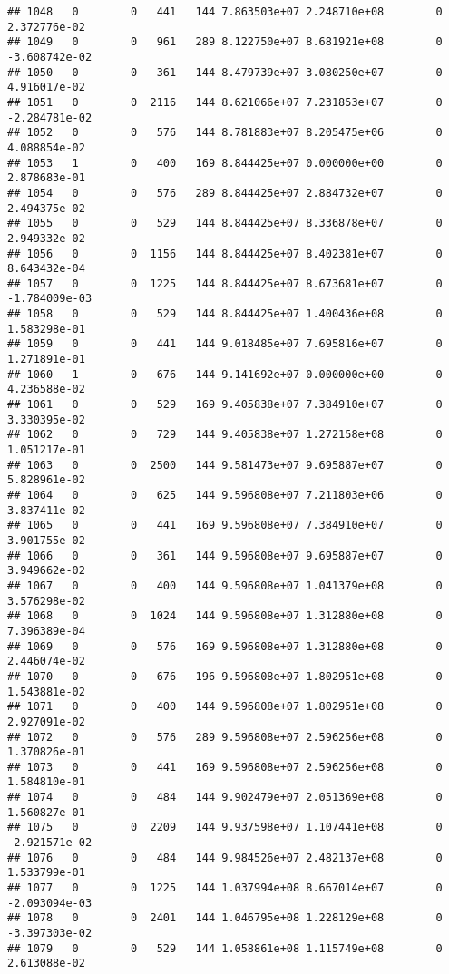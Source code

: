 \documentclass[
]{article}
\begin{document}
\begin{enumerate}
\begin{verbatim}
## 1048   0        0   441   144 7.863503e+07 2.248710e+08        0  2.372776e-02
## 1049   0        0   961   289 8.122750e+07 8.681921e+08        0 -3.608742e-02
## 1050   0        0   361   144 8.479739e+07 3.080250e+07        0  4.916017e-02
## 1051   0        0  2116   144 8.621066e+07 7.231853e+07        0 -2.284781e-02
## 1052   0        0   576   144 8.781883e+07 8.205475e+06        0  4.088854e-02
## 1053   1        0   400   169 8.844425e+07 0.000000e+00        0  2.878683e-01
## 1054   0        0   576   289 8.844425e+07 2.884732e+07        0  2.494375e-02
## 1055   0        0   529   144 8.844425e+07 8.336878e+07        0  2.949332e-02
## 1056   0        0  1156   144 8.844425e+07 8.402381e+07        0  8.643432e-04
## 1057   0        0  1225   144 8.844425e+07 8.673681e+07        0 -1.784009e-03
## 1058   0        0   529   144 8.844425e+07 1.400436e+08        0  1.583298e-01
## 1059   0        0   441   144 9.018485e+07 7.695816e+07        0  1.271891e-01
## 1060   1        0   676   144 9.141692e+07 0.000000e+00        0  4.236588e-02
## 1061   0        0   529   169 9.405838e+07 7.384910e+07        0  3.330395e-02
## 1062   0        0   729   144 9.405838e+07 1.272158e+08        0  1.051217e-01
## 1063   0        0  2500   144 9.581473e+07 9.695887e+07        0  5.828961e-02
## 1064   0        0   625   144 9.596808e+07 7.211803e+06        0  3.837411e-02
## 1065   0        0   441   169 9.596808e+07 7.384910e+07        0  3.901755e-02
## 1066   0        0   361   144 9.596808e+07 9.695887e+07        0  3.949662e-02
## 1067   0        0   400   144 9.596808e+07 1.041379e+08        0  3.576298e-02
## 1068   0        0  1024   144 9.596808e+07 1.312880e+08        0  7.396389e-04
## 1069   0        0   576   169 9.596808e+07 1.312880e+08        0  2.446074e-02
## 1070   0        0   676   196 9.596808e+07 1.802951e+08        0  1.543881e-02
## 1071   0        0   400   144 9.596808e+07 1.802951e+08        0  2.927091e-02
## 1072   0        0   576   289 9.596808e+07 2.596256e+08        0  1.370826e-01
## 1073   0        0   441   169 9.596808e+07 2.596256e+08        0  1.584810e-01
## 1074   0        0   484   144 9.902479e+07 2.051369e+08        0  1.560827e-01
## 1075   0        0  2209   144 9.937598e+07 1.107441e+08        0 -2.921571e-02
## 1076   0        0   484   144 9.984526e+07 2.482137e+08        0  1.533799e-01
## 1077   0        0  1225   144 1.037994e+08 8.667014e+07        0 -2.093094e-03
## 1078   0        0  2401   144 1.046795e+08 1.228129e+08        0 -3.397303e-02
## 1079   0        0   529   144 1.058861e+08 1.115749e+08        0  2.613088e-02

\end{verbatim}
\end{enumerate}
\end{document}
